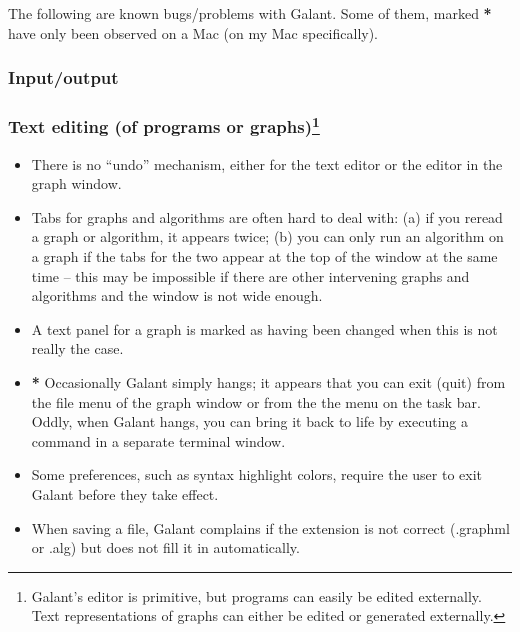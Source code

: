 The following are known bugs/problems with Galant. Some of them, marked
\textbf{*} have only been observed on a Mac (on my Mac specifically).

\subsubsection*{Input/output}

\subsubsection*{Text editing (of programs or graphs)\footnote{
Galant's editor  is primitive, but
programs can easily be edited externally.
Text representations of graphs can either be edited or generated externally.}}

\begin{itemize}

\item There is no ``undo'' mechanism, either for the text editor or the
  editor in the graph window.

\item Tabs for graphs and algorithms are often hard to deal with: (a) if you
  reread a graph or algorithm, it appears twice; (b) you can only run an
  algorithm on a graph if the tabs for the two appear at the top of the
  window at the same time -- this
  may be impossible if there are other intervening graphs and algorithms
  and the window is not wide enough.

\item A text panel for a graph is marked as having been changed when
  this is not really the case.

\item \textbf{*} Occasionally Galant simply hangs;
  it appears that you can exit (quit) from
  the file menu of the graph window or from the the  menu on the
  task bar.
  Oddly, when Galant hangs, you can bring it back to life by executing a
  command in a separate terminal window.

\item
  Some preferences, such as syntax highlight colors, require the user to exit
  Galant before they take effect.

\item
  When saving a file, Galant complains if the extension is not correct
  (\textsf{.graphml} or \textsf{.alg}) but does not fill it in automatically.

\end{itemize}

